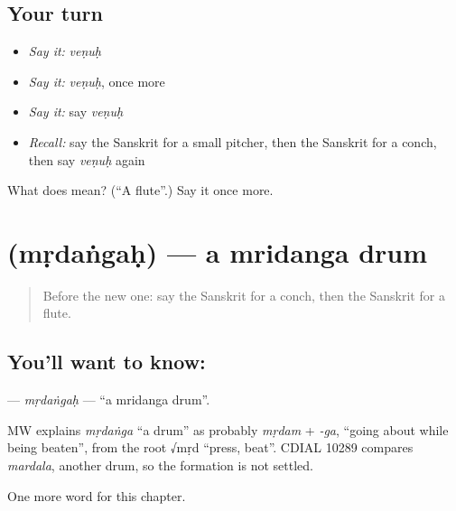\subsection*{Your turn}
\begin{itemize}
\raggedright
  \item \emph{Say it:} \emph{veṇuḥ}
  \item \emph{Say it:} \emph{veṇuḥ}, once more
  \item \emph{Say it:} say \emph{veṇuḥ}
  \item \emph{Recall:} say the Sanskrit for a small pitcher, then the Sanskrit for a conch, then say \emph{veṇuḥ} again
\end{itemize}

\begin{tcolorbox}[breakable,colback=teal!4,colframe=teal!35!black,title={Before you move on}]
What does  mean? (\textquotedblleft{}A flute\textquotedblright{}.) Say it once more.
\end{tcolorbox}
\section[\texorpdfstring{\sk{मृदंगः} (mṛdaṅgaḥ)}{मृदंगः (mṛdaṅgaḥ)}]{ (mṛdaṅgaḥ) — a mridanga drum}

\label{lesson:SA-C161-mrdangah}



\begin{quote}
Before the new one: say the Sanskrit for a conch, then the Sanskrit for a flute.
\end{quote}

\subsection*{You'll want to know: }
\textbf{} — \emph{mṛdaṅgaḥ} — \textquotedblleft{}a mridanga drum\textquotedblright{}.

\begin{cousinweb}
MW explains \emph{mṛdaṅga} \textquotedblleft{}a drum\textquotedblright{} as probably \emph{mṛdam} + \emph{-ga}, \textquotedblleft{}going about while being beaten\textquotedblright{}, from the root √mṛd \textquotedblleft{}press, beat\textquotedblright{}. CDIAL 10289 compares \emph{mardala}, another drum, so the formation is not settled.
\end{cousinweb}

\begin{grammarlens}[title={What you've built}]
One more word for this chapter.
\end{grammarlens}

